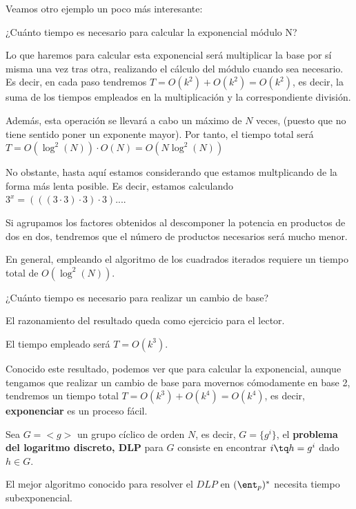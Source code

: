Veamos otro ejemplo un poco más interesante:

\begin{example}
¿Cuánto tiempo es necesario para calcular la exponencial módulo N?

Lo que haremos para calcular esta exponencial será multiplicar la base por sí misma una vez tras otra, realizando el cálculo del módulo cuando sea necesario. Es decir, en cada paso tendremos $T=O(k^2)+O(k^2) = O(k^2)$, es decir, la suma de los tiempos empleados en la multiplicación y la correspondiente división.

Además, esta operación se llevará a cabo un máximo de $N$ veces, (puesto que no tiene sentido poner un exponente mayor). Por tanto, el tiempo total será $T=O(\log^2(N))\cdot O(N) = O(N\log^2(N))$

No obstante, hasta aquí estamos considerando que estamos multplicando de la forma más lenta posible. Es decir, estamos calculando $3^x = (((3\cdot 3)\cdot 3) \cdot 3) ...$.

Si agrupamos los factores obtenidos al descomponer la potencia en productos de dos en dos, tendremos que el número de productos necesarios será mucho menor.

En general, empleando el algoritmo de los cuadrados iterados requiere un tiempo total de $O(\log^2(N))$.
\end{example}

\begin{example}
¿Cuánto tiempo es necesario para realizar un cambio de base?

El razonamiento del resultado queda como ejercicio para el lector.

El tiempo empleado será $T=O(k^3)$.

Conocido este resultado, podemos ver que para calcular la exponencial, aunque tengamos que realizar un cambio de base para movernos cómodamente en base 2, tendremos un tiempo total $T=O(k^3)+O(k^4)=O(k^4)$, es decir, \textbf{exponenciar} es un proceso fácil.

\end{example}

\begin{defn}
Sea $G=<g>$ un grupo cíclico de orden $N$, es decir, $G=\{g^i \}$, el \textbf{problema del logaritmo discreto, DLP} para $G$ consiste en encontrar $i \tq h=g^i$ dado $h \in G$.

El mejor algoritmo conocido para resolver el $DLP$ en $(\ent_p)^*$ necesita tiempo subexponencial.
\end{defn}

